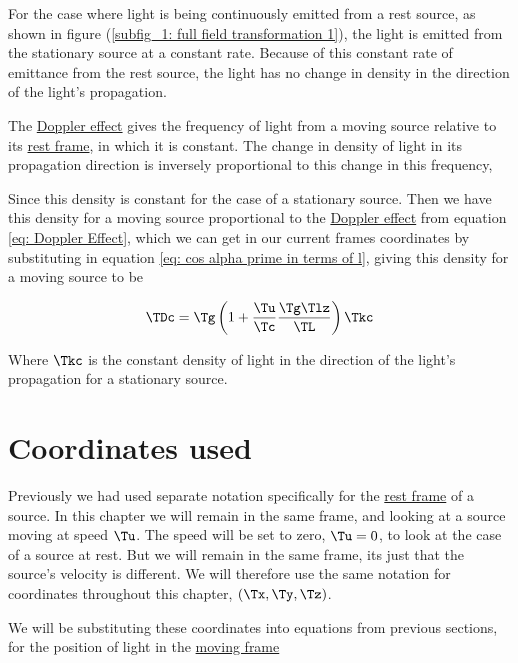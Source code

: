 For the case where light is being continuously emitted from a rest source, as shown in figure (\ref{subfig_1: full field transformation 1}), the light is emitted from the stationary source at a constant rate.
Because of this constant rate of emittance from the rest source, the light has no change in density in the direction of the light's propagation.

The \hyperlink{def-doppler-effect}{Doppler effect} gives the frequency of light from a moving source relative to its \hyperlink{def-proper-frame}{rest frame}, in which it is constant.
The change in density of light in its propagation direction is inversely proportional to this change in this frequency,

Since this density is constant for the case of a stationary source.
Then we have this density for a moving source proportional to the \hyperlink{def-doppler-effect}{Doppler effect} from equation \eqref{eq: Doppler Effect}, which we can get in our current frames coordinates by substituting in equation \eqref{eq: cos alpha prime in terms of l}, giving this density for a moving source to be

\begin{equation}
	\label{eq: denisty of light parallel to propagation}
	\TDc  = {\Tg }\left(1 + \dfrac{\Tu }{\Tc }\frac{\Tg  \Tlz }{\TL }\right) \Tkc
\end{equation}

Where $\Tkc $ is the constant density of light in the direction of the light's propagation for a stationary source.


\section{Coordinates used}\label{sect: Coordinates used}

Previously we had used separate notation specifically for the \hyperlink{def-proper-frame}{rest frame} of a source.
In this chapter we will remain in the same frame, and looking at a source moving at speed $\Tu $.
The speed will be set to zero, $\Tu =0$, to look at the case of a source at rest.
But we will remain in the same frame, its just that the source's velocity is different.
We will therefore use the same notation for coordinates throughout this chapter, $(\Tx ,\Ty ,\Tz )$.

We will be substituting these coordinates into equations from previous sections, for the position of light in the \hyperlink{def-Moving-Frame}{moving frame}

